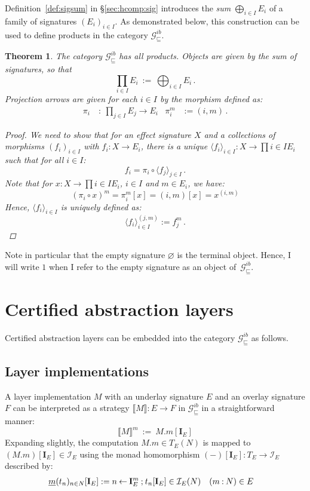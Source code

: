 \documentclass[11pt,oneside]{book}
\newtheorem{theorem}{Theorem}[chapter]
\theoremstyle{definition}
\newcommand{\gcat}{\mathcal{G}_{\sqsubseteq}}
\newcommand{\ul}[1]{%
  \underline{\smash{#1}}
}
\begin{document}
Definition~\ref{def:sigsum} in \S\ref{sec:hcomp:sig}
introduces the \emph{sum} $\bigoplus_{i \in I} E_i$
of a family of signatures $(E_i)_{i \in I}$.
As demonstrated below,
this construction can be used to define
products in the category $\gcat^{ib}$.

\begin{theorem}
The category $\gcat^{ib}$ has all products.
Objects are given by the
sum of signatures, so that
\[
  \prod_{i \in I} E_i \: := \: \bigoplus_{i \in I} E_i
  \,.
\]
Projection arrows are
given for each $i \in I$ by
the morphism defined as:
\begin{align*}
  \pi_i \: &: \: \prod_{j \in I} E_j \rightarrow E_i
  &
  \pi_i^m &:= (i, m) \,.
\end{align*}
\begin{proof}
We need to show that for an effect signature $X$
and a collections of morphisms $(f_i)_{i \in I}$ with
$f_i : X \rightarrow E_i$,
there is a unique
$\langle f_i \rangle_{i \in I} : X \rightarrow \prod{i \in I} E_i$
such that for all $i \in I$:
\[
    f_i = \pi_i \circ \langle f_j \rangle_{j \in I} \,.
\]
Note that for $x : X \rightarrow \prod{i \in I} E_i$,
$i \in I$ and $m \in E_i$, we have:
\[
    (\pi_i \circ x)^m = \pi_i^m[x] = (i, m) [x] = x^{(i, m)}
\]
Hence, $\langle f_i \rangle_{i \in I}$ is uniquely defined as:
\[
    \langle f_i \rangle_{i \in I}^{(j, m)} := f_j^m \,.
\]
\end{proof}
\end{theorem}

Note in particular that the empty signature $\varnothing$
is the terminal object.
Hence,
I will write $1$ when I refer to the empty signature
as an object of~$\gcat^{ib}$.


\section{Certified abstraction layers} \label{sec:intspec:cal} %

Certified abstraction layers can be embedded into
the category $\gcat^{ib}$ as follows.

\subsection{Layer implementations} %

A layer implementation $M$ with
an underlay signature $E$ and
an overlay signature $F$
can be interpreted as a strategy
$\llbracket M \rrbracket : E \rightarrow F$
in $\gcat^{ib}$
in a straightforward manner:
\[
  \llbracket M \rrbracket^m \: := \: M.m[\mathbf{I}_E]
\]
Expanding slightly,
the computation $M.m \in T_E(N)$
is mapped to $(M.m)[\mathbf{I}_E] \in \mathcal{I}_E$
using the monad homomorphism
$(-)[\mathbf{I}_E] : T_E \rightarrow \mathcal{I}_E$
described by:
\begin{align*}
  \ul{m}(t_n)_{n \in N}[\mathbf{I}_E] &:=
    n \mathbin\leftarrow \mathbf{I}_E^m \mathbin; t_n[\mathbf{I}_E]
    \in \mathcal{I}_E(N) &
    (m \mathbin: N) &\in E
\end{align*}
\end{document}
